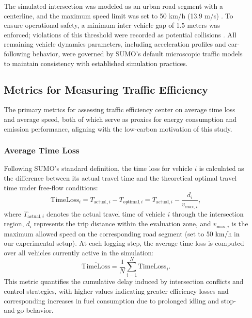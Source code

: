 \documentclass[journal]{IEEEtran}
\begin{document}
The simulated intersection was modeled as an urban road segment with a centerline, and the maximum speed limit was set to 50 km/h (13.9 m/s) \cite{PRC_Traffic_Reg_2004}. To ensure operational safety, a minimum inter-vehicle gap of 1.5 meters was enforced; violations of this threshold were recorded as potential collisions \cite{GB51286}. All remaining vehicle dynamics parameters, including acceleration profiles and car-following behavior, were governed by SUMO's default microscopic traffic models to maintain consistency with established simulation practices.

\subsection{Metrics for Measuring Traffic Efficiency} 





The primary metrics for assessing traffic efficiency center on average time loss and average speed, both of which serve as proxies for energy consumption and emission performance, aligning with the low-carbon motivation of this study. 

\subsubsection{Average Time Loss} 
Following SUMO's standard definition, the time loss for vehicle $i$ is calculated as the difference between its actual travel time and the theoretical optimal travel time under free-flow conditions:
\begin{equation}
\text{TimeLoss}_i = T_{\text{actual},i} - T_{\text{optimal},i} = T_{\text{actual},i} - \frac{d_i}{v_{\text{max},i}},
\end{equation}
where $T_{\text{actual},i}$ denotes the actual travel time of vehicle $i$ through the intersection region, $d_i$ represents the trip distance within the evaluation zone, and $v_{\text{max},i}$ is the maximum allowed speed on the corresponding road segment (set to 50 km/h in our experimental setup). At each logging step, the average time loss is computed over all vehicles currently active in the simulation:
\begin{equation}
\overline{\text{TimeLoss}} = \frac{1}{N} \sum_{i=1}^{N} \text{TimeLoss}_i.
\end{equation}
This metric quantifies the cumulative delay induced by intersection conflicts and control strategies, with higher values indicating greater efficiency losses and corresponding increases in fuel consumption due to prolonged idling and stop-and-go behavior.
\end{document}
